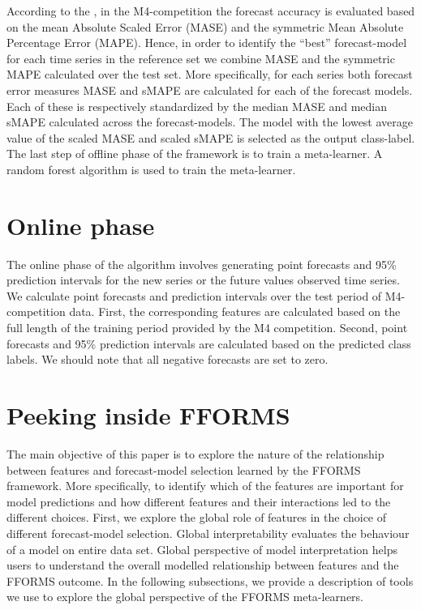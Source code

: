 \documentclass[11pt,a4paper,]{article}
\begin{document}
According to the \textcite{M4compguide}, in the M4-competition the forecast accuracy is evaluated based on the mean Absolute Scaled Error (MASE) and the symmetric Mean Absolute Percentage Error (MAPE). Hence, in order to identify the ``best'' forecast-model for each time series in the reference set we combine MASE and the symmetric MAPE calculated over the test set. More specifically, for each series both forecast error measures MASE and sMAPE are calculated for each of the forecast models. Each of these is respectively standardized by the median MASE and median sMAPE calculated across the forecast-models. The model with the lowest average value of the scaled MASE and scaled sMAPE is selected as the output class-label. The last step of offline phase of the framework is to train a meta-learner. A random forest algorithm is used to train the meta-learner.

\hypertarget{online}{%
\section{Online phase}\label{online}}

The online phase of the algorithm involves generating point forecasts and 95\% prediction intervals for the new series or the future values observed time series. We calculate point forecasts and prediction intervals over the test period of M4-competition data. First, the corresponding features are calculated based on the full length of the training period provided by the M4 competition. Second, point forecasts and 95\% prediction intervals are calculated based on the predicted class labels. We should note that all negative forecasts are set to zero.

\hypertarget{peeking}{%
\section{Peeking inside FFORMS}\label{peeking}}

The main objective of this paper is to explore the nature of the relationship between features and forecast-model selection learned by the FFORMS framework. More specifically, to identify which of the features are important for model predictions and how different features and their interactions led to the different choices. First, we explore the global role of features in the choice of different forecast-model selection. Global interpretability evaluates the behaviour of a model on entire data set. Global perspective of model interpretation helps users to understand the overall modelled relationship between features and the FFORMS outcome. In the following subsections, we provide a description of tools we use to explore the global perspective of the FFORMS meta-learners.
\end{document}
